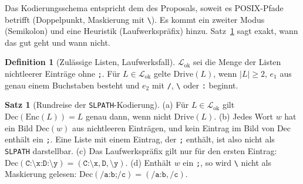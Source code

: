 \documentclass[a4paper,12pt,twoside]{report}
\DeclareRobustCommand{\_}{\ifmmode\mbox{\textunderscore}\else\textunderscore\allowbreak{}\fi}
\theoremstyle{definition}
\newtheorem{definition}{Definition}[chapter]
\newtheorem{satz}{Satz}[chapter]
\begin{document}
Das Kodierungsschema entspricht dem des Proposals, soweit es POSIX-Pfade betrifft (Doppelpunkt, Maskierung mit \texttt{\textbackslash}). Es kommt ein zweiter Modus (Semikolon) und eine Heuristik (Laufwerkspräfix) hinzu. Satz~\ref{satz:slpath} sagt exakt, wann das gut geht und wann nicht.

\begin{definition}[Zulässige Listen, Laufwerksfall]
	$\mathcal L_{\mathrm{ok}}$ sei die Menge der Listen nichtleerer Einträge ohne \texttt{;}. Für $L\in\mathcal L_{\mathrm{ok}}$ gelte $\mathrm{Drive}(L)$, wenn $|L|\ge2$, $e_1$ aus genau einem Buchstaben besteht und $e_2$ mit \texttt{/}, \texttt{\textbackslash} oder \texttt{:} beginnt.
\end{definition}

\begin{satz}[Rundreise der \texttt{SL\_PATH}-Kodierung]
	\label{satz:slpath}
	(a) Für $L\in\mathcal L_{\mathrm{ok}}$ gilt $\mathrm{Dec}(\mathrm{Enc}(L))=L$ genau dann, wenn nicht $\mathrm{Drive}(L)$. (b) Jedes Wort $w$ hat ein Bild $\mathrm{Dec}(w)$ aus nichtleeren Einträgen, und kein Eintrag im Bild von $\mathrm{Dec}$ enthält ein \texttt{;}. Eine Liste mit einem Eintrag, der \texttt{;} enthält, ist also nicht als \texttt{SL\_PATH} darstellbar. (c) Das Laufwerkspräfix gilt nur für den ersten Eintrag: $\mathrm{Dec}(\texttt{C:\textbackslash x:D:\textbackslash y})=(\texttt{C:\textbackslash x},\texttt{D},\texttt{\textbackslash y})$. (d) Enthält $w$ ein \texttt{;}, so wird \texttt{\textbackslash} nicht als Maskierung gelesen: $\mathrm{Dec}(\texttt{/a:b;/c})=(\texttt{/a:b},\texttt{/c})$.
\end{satz}
\end{document}
